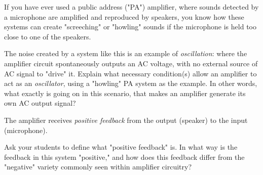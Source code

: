 

If you have ever used a public address ("PA") amplifier, where sounds detected by a microphone are amplified and reproduced by speakers, you know how these systems can create "screeching" or "howling" sounds if the microphone is held too close to one of the speakers.

The noise created by a system like this is an example of {\it oscillation}: where the amplifier circuit spontaneously outputs an AC voltage, with no external source of AC signal to "drive" it.  Explain what necessary condition(s) allow an amplifier to act as an {\it oscillator}, using a "howling" PA system as the example.  In other words, what exactly is going on in this scenario, that makes an amplifier generate its own AC output signal?







The amplifier receives {\it positive feedback} from the output (speaker) to the input (microphone).







Ask your students to define what "positive feedback" is.  In what way is the feedback in this system "positive," and how does this feedback differ from the "negative" variety commonly seen within amplifier circuitry?





